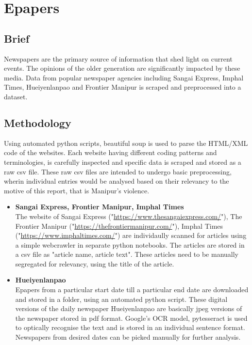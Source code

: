 \documentclass{report}
\begin{document}
\newpage
\vspace*{3pt}
\section{Epapers}
\subsection{Brief}
Newspapers are the primary source of information that shed light on current events. The opinions of the older generation are significantly impacted by these media. Data from popular newspaper agencies including Sangai Express, Imphal Times, Hueiyenlanpao and Frontier Manipur is scraped and preprocessed into a dataset.
\subsection{Methodology}
Using automated python scripts, beautiful soup is used to parse the HTML/XML code of the websites. Each website having different coding patterns and terminologies, is carefully inspected and specific data is scraped and stored as a raw csv file. These raw csv files are intended to undergo basic preprocessing, wherin individual entries would be analysed based on their relevancy to the motive of this report, that is Manipur's violence.
\begin{itemize}
    \item \textbf{Sangai Express, Frontier Manipur, Imphal Times}
    \\The website of Sangai Express ("\url{https://www.thesangaiexpress.com/}"), The Frontier Manipur ("\url{https://thefrontiermanipur.com/}"), Imphal Times ("\url{https://www.imphaltimes.com/}") are individaully scanned for articles using a simple webcrawler in separate python notebooks. The articles are stored in a csv file as "article name, article text". These articles need to be manually segregated for relevancy, using the title of the article.
    \item \textbf{Hueiyenlanpao}
    \\Epapers from a particular start date till a particular end date are downloaded and stored in a folder, using an automated python script. These digital versions of the daily newspaper Hueiyenlanpao are basically jpeg versions of the newspaper stored in pdf format. Google's OCR model, pytesseract is used to optically recognise the text and is stored in an individual sentence format. Newspapers from desired dates can be picked manually for further analysis.
\end{itemize}
\end{document}
